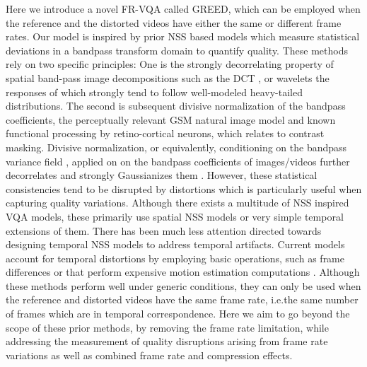 \documentclass[journal]{IEEEtran}
\newcommand{\ie}{{i}.{e}.}
\begin{document}
Here we introduce a novel FR-VQA called GREED, which can be employed when the reference and the distorted videos have either the same or different frame rates. Our model is inspired by prior NSS based models which measure statistical deviations in a bandpass transform domain to quantify quality. These methods rely on two specific principles: One is the strongly decorrelating property of spatial band-pass image decompositions such as the DCT \cite{saad2014blind}, or wavelets \cite{sheikh2006image,soundararajan2012rred,soundararajan2012video} the responses of which strongly tend to follow well-modeled heavy-tailed distributions. The second is subsequent divisive normalization of the bandpass coefficients, the perceptually relevant GSM natural image model and known functional processing by retino-cortical neurons, which relates to contrast masking. Divisive normalization, or equivalently, conditioning on the bandpass variance field \cite{sheikh2006image}, applied on on the bandpass coefficients of images/videos further decorrelates and strongly Gaussianizes them \cite{ruderman1994statistics,mittal2012no}. However, these statistical consistencies tend to be disrupted by distortions which is particularly useful when capturing quality variations. Although there exists a multitude of NSS inspired VQA models, these primarily use spatial NSS models or very simple temporal extensions of them. There has been much less attention directed towards designing temporal NSS models to address temporal artifacts. Current models account for temporal distortions by employing basic operations, such as frame differences \cite{soundararajan2012video,saad2014blind,VMAF2016,bampis2018spatiotemporal} or that perform expensive motion estimation computations \cite{seshadrinathan2009motion,vu2011spatiotemporal,manasa2016optical}. Although these methods perform well under generic conditions, they can only  be used when the reference and distorted videos have the same frame rate, \ie the same number of frames which are in temporal correspondence. Here we aim to go beyond the scope of these prior methods, by removing the frame rate limitation, while addressing the measurement of quality disruptions arising from frame rate variations as well as combined frame rate and compression effects.
\end{document}
